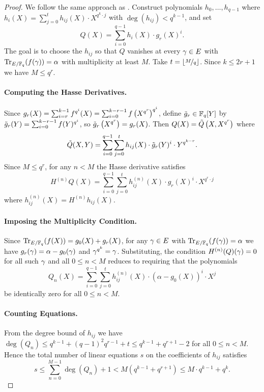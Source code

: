 \begin{proof}
  We follow the same approach as \Stepanov. Construct polynomials $h_0,\dots, h_{q-1}$ where $h_i(X)=\sum_{j=0}^t h_{ij}(X)\cdot X^{q^k\cdot j}$ with $\deg(h_{ij})<q^{k-1}$, and set $$Q(X)=\sum_{i=0}^{q-1}h_i(X)\cdot g_r(X)^i.$$ The goal is to choose the $h_{ij}$ so that $Q$ vanishes at every $\gamma\in E$ with $\operatorname{Tr}_{E/\mathbb{F}_q}(f(\gamma))=\alpha$ with multiplicity at least $M$. Take $t=\left\lfloor\nicefrac{M}q\right\rfloor$. Since $k\leq 2r+1$ we have $M\leq q^r$.

  \paragraph*{Computing the Hasse Derivatives.} Since $g_r(X)=\sum_{i=r}^{k-1}f^{q^i}(X)=\sum_{i=0}^{k-r-1}f\left(X^{q^r}\right)^{q^i}$, define $\tilde{g}_r\in\mathbb{F}_q[Y]$ by $\tilde{g}_r(Y)=\sum_{i=0}^{k-r-1}f(Y)^{q^i}$, so $\tilde{g}_r\left(X^{q^r}\right)=g_r(X)$. Then $Q(X)=\tilde{Q}\left(X,X^{q^r}\right)$ where $$\tilde{Q}(X,Y)=\sum_{i=0}^{q-1}\sum_{j=0}^th_{ij}(X)\cdot \tilde{g}_r(Y)^i\cdot Y^{q^{k-r}}.$$ Since $M\leq q^r$, for any $n<M$ the Hasse derivative satisfies $$H^{(n)}Q(X)=\sum_{i=0}^{q-1}\sum_{j=0}^t h_{ij}^{(n)}(X)\cdot g_r(X)^i\cdot X^{q^r\cdot j}$$ where $h_{ij}^{(n)}(X)=H^{(n)}h_{ij}(X)$.

  \paragraph*{Imposing the Multiplicity Condition.} Since $\operatorname{Tr}_{E/\mathbb{F}_q}(f(X))=g_0(X)+g_r(X)$, for any $\gamma\in E$ with $\operatorname{Tr}_{E/\mathbb{F}_q}(f(\gamma))=\alpha$ we have $g_r(\gamma)=\alpha-g_0(\gamma)$ and $\gamma^{q^k}=\gamma$. Substituting, the condition $H^{(n)}(Q)(\gamma)=0$ for all such $\gamma$ and all $0\leq n<M$ reduces to requiring that the polynomials $$Q_n(X)=\sum_{i=0}^{q-1}\sum_{j=0}^t h_{ij}^{(n)}(X)\cdot (\alpha-g_0(X))^i\cdot X^{j}$$ be identically zero for all $0\leq n<M$.

  \paragraph*{Counting Equations.} From the degree bound of $h_{ij}$ we have $\deg(Q_n)\leq q^{k-1}+(q-1)^2q^{r-1}+t\leq q^{k-1}+q^{r+1}-2$ for all $0\leq n<M$. Hence the total number of linear equations $s$ on the coefficients of $h_{ij}$ satisfies \begin{equation}\label{eq:bombieri-num-equations}
    s\leq \sum_{n=0}^{M-1}\deg(Q_n)+1<M(q^{k-1}+q^{r+1})\leq M\cdot q^{k-1}+q^k.
  \end{equation}


\end{proof}

